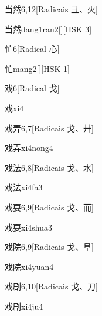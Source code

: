 \begin{entry}{当然}{6,12}[Radicais ⼹、⽕]
  \begin{phonetics}{当然}{dang1ran2}[][HSK 3]
  \end{phonetics}
\end{entry}

\begin{entry}{忙}{6}[Radical ⼼]
  \begin{phonetics}{忙}{mang2}[][HSK 1]
  \end{phonetics}
\end{entry}

\begin{entry}{戏}{6}[Radical ⼽]
  \begin{phonetics}{戏}{xi4}
  \end{phonetics}
\end{entry}

\begin{entry}{戏弄}{6,7}[Radicais ⼽、⼶]
  \begin{phonetics}{戏弄}{xi4nong4}
  \end{phonetics}
\end{entry}

\begin{entry}{戏法}{6,8}[Radicais ⼽、⽔]
  \begin{phonetics}{戏法}{xi4fa3}
  \end{phonetics}
\end{entry}

\begin{entry}{戏耍}{6,9}[Radicais ⼽、⽽]
  \begin{phonetics}{戏耍}{xi4shua3}
  \end{phonetics}
\end{entry}

\begin{entry}{戏院}{6,9}[Radicais ⼽、⾩]
  \begin{phonetics}{戏院}{xi4yuan4}
  \end{phonetics}
\end{entry}

\begin{entry}{戏剧}{6,10}[Radicais ⼽、⼑]
  \begin{phonetics}{戏剧}{xi4ju4}
  \end{phonetics}
\end{entry}


